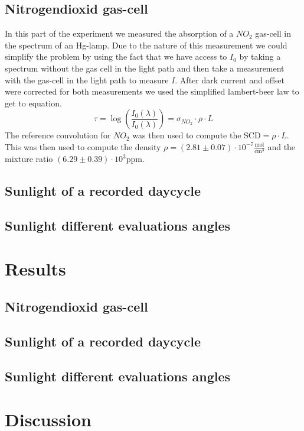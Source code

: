 \documentclass[12pt, english]{scrartcl} %
\begin{document}
\begin{multicols}{2}
\subsection{Nitrogendioxid gas-cell}
In this part of the experiment we measured the absorption of a $NO_2$ gas-cell in the spectrum of an Hg-lamp. Due to the nature of this measurement we could simplify the problem by using the fact that we have access to $I_0$ by taking a spectrum without the gas cell in the light path and then take a measurement with the gas-cell in the light path to measure $I$. After dark current and offset were corrected for both measurements we used the simplified lambert-beer law to get to equation.
\begin{equation}
\tau = \log(\frac{I_0(\lambda)}{I_0(\lambda)})= \sigma_{NO_2} \cdot \rho \cdot L
\end{equation}
The reference convolution for $NO_2$ was then used to compute the SCD$= \rho \cdot L$. This was then used to compute the density $\rho = (2.81 \pm 0.07 ) \cdot 10^{-7} \frac{\text{mol}}{\text{cm}^3}$ and the mixture ratio $(6.29 \pm 0.39) \cdot 10^3 \text{ppm}$.
\subsection{Sunlight of a recorded daycycle}

\subsection{Sunlight different evaluations angles}

\section{Results}
\subsection{Nitrogendioxid gas-cell}

\subsection{Sunlight of a recorded daycycle}

\subsection{Sunlight different evaluations angles}


\section{Discussion}
\end{multicols}
\end{document}
